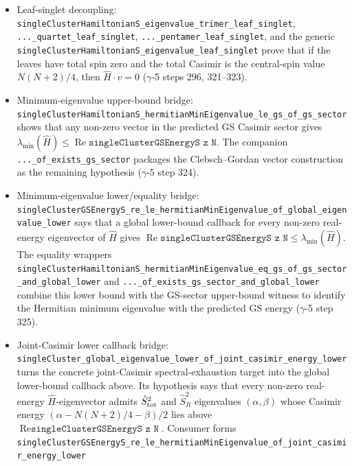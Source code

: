 \documentclass[a4paper,11pt]{article}
\begin{document}
\begin{itemize}
        ($\gamma$-5 steps 303--306 and 312--315).
  \item Leaf-singlet decoupling:
        \texttt{singleClusterHamiltonianS\_eigenvalue\_trimer\_leaf\_singlet},
        \texttt{...\_quartet\_leaf\_singlet},
        \texttt{...\_pentamer\_leaf\_singlet}, and the generic
        \texttt{singleClusterHamiltonianS\_eigenvalue\_leaf\_singlet}
        prove that if the leaves have total spin zero and the total
        Casimir is the central-spin value $N(N+2)/4$, then
        $\hat H \cdot v = 0$ ($\gamma$-5 steps 296, 321--323).
  \item Minimum-eigenvalue upper-bound bridge:
        \texttt{singleClusterHamiltonianS\_hermitianMinEigenvalue\_le\_gs\_of\_gs\_sector}
        shows that any non-zero vector in the predicted GS Casimir
        sector gives
        $\lambda_{\min}(\hat H) \le \operatorname{Re}
        \texttt{singleClusterGSEnergyS z N}$.  The companion
        \texttt{...\_of\_exists\_gs\_sector} packages the
        Clebsch--Gordan vector construction as the remaining
        hypothesis ($\gamma$-5 step 324).
  \item Minimum-eigenvalue lower/equality bridge:
        \texttt{singleClusterGSEnergyS\_re\_le\_hermitianMinEigenvalue\_of\_global\_eigenvalue\_lower}
        says that a global lower-bound callback for every non-zero
        real-energy eigenvector of $\hat H$ gives
        $\operatorname{Re}\texttt{singleClusterGSEnergyS z N}
        \le \lambda_{\min}(\hat H)$.  The equality wrappers
        \texttt{singleClusterHamiltonianS\_hermitianMinEigenvalue\_eq\_gs\_of\_gs\_sector\_and\_global\_lower}
        and \texttt{...\_of\_exists\_gs\_sector\_and\_global\_lower}
        combine this lower bound with the GS-sector upper-bound
        witness to identify the Hermitian minimum eigenvalue with
        the predicted GS energy ($\gamma$-5 step 325).
  \item Joint-Casimir lower callback bridge:
        \texttt{singleCluster\_global\_eigenvalue\_lower\_of\_joint\_casimir\_energy\_lower}
        turns the concrete joint-Casimir spectral-exhaustion target
        into the global lower-bound callback above.  Its hypothesis says
        that every non-zero real-energy $\hat H$-eigenvector admits
        $\hat S_{\rm tot}^2$ and $\hat S_R^2$ eigenvalues
        $(\alpha,\beta)$ whose Casimir energy
        $(\alpha - N(N+2)/4 - \beta)/2$ lies above
        $\operatorname{Re}\texttt{singleClusterGSEnergyS z N}$.
        Consumer forms
        \texttt{singleClusterGSEnergyS\_re\_le\_hermitianMinEigenvalue\_of\_joint\_casimir\_energy\_lower}

\end{itemize}
\end{document}

